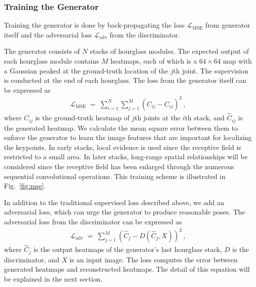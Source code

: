 \documentclass[10pt,twocolumn,letterpaper]{article}
\begin{document}
\subsubsection{Training the Generator} \label{subsec:first_training}

Training the generator is done by back-propagating the loss $\mathcal{L}_{\mathrm{MSE}}$ from generator itself and the adversarial loss $\mathcal{L}_{\mathrm{adv}}$ from the discriminator. 

The generator consists of $N$ stacks of hourglass modules. The expected output of each hourglass module contains $M$ heatmaps, each of which is a $64\times64$ map with a Gaussian peaked at the ground-truth location of the $j$th joint. The supervision is conducted at the end of each hourglass. The loss from the generator itself can be expressed as
\begin{equation}
	\begin{aligned}
		\mathcal{L}_{\mathrm{MSE}}\;=\; \sum\limits_{i=1}^{N}\sum\limits_{j=1}^M (C_{ij} -\hat{C}_{ij})^2 \,,
	\end{aligned}
    \label{G1}
\end{equation}
where $C_{ij}$ is the ground-truth heatmap of $j$th joints at the $i$th stack, and $\hat{C}_{ij}$ is the generated heatmap. We calculate the mean square error between them to enforce the generator to learn the image features that are important for localizing the keypoints. In early stacks, local evidence is used since the receptive field is restricted to a small area. In later stacks, long-range spatial relationships will be considered since the receptive field has been enlarged through the numerous sequential convolutional operations. This training scheme is illustrated in Fig.~\ref{fig:mse}.


In addition to the traditional supervised loss described above, we add an adversarial loss, which can urge the generator to produce reasonable poses. The adversarial loss from the discriminator can be expressed as
\begin{equation}
	\begin{aligned}
		\mathcal{L}_{\mathrm{adv}}\;=\; \sum\limits_{j=1}^M (\hat{C}_{j}-D(\hat{C}_{j}, X))^2 \,,
	\end{aligned}
    \label{G2}
\end{equation}
where $\hat{C}_{j}$ is the output heatmaps of the generator's last hourglass stack, $D$ is the discriminator, and $X$ is an input image. The loss computes the error between generated heatmaps and reconstructed heatmaps. The detail of this equation will be explained in the next section.
\end{document}
